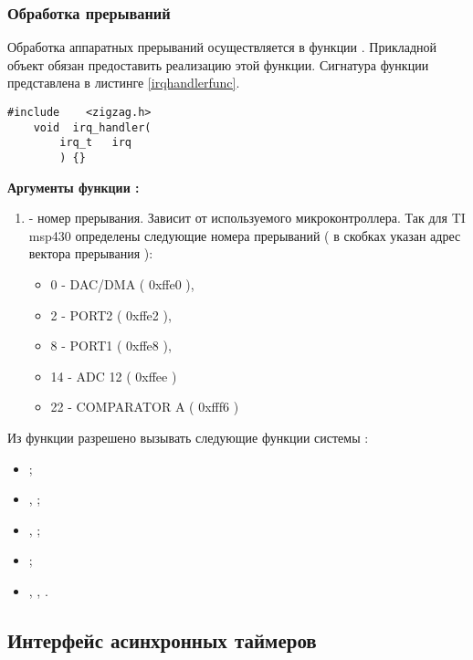 \subsubsection{Обработка прерываний}

Обработка аппаратных прерываний осуществляется в функции . Прикладной объект обязан 
предоставить реализацию этой функции. Сигнатура функции представлена в листинге \ref{irqhandlerfunc}.

\begin{lstlisting}[caption=Функция \myfunc{irq\_handler()} - обработчик прерываний., label=irqhandlerfunc ]
    #include    <zigzag.h>
    void  irq_handler(
        irq_t   irq
        ) {}
\end{lstlisting}

{\bfseries Аргументы функции :}

{\itshape
\begin{enumerate}
\item {} - номер прерывания. Зависит от используемого микроконтроллера. Так для TI msp430 определены
следующие номера прерываний ( в скобках указан адрес вектора прерывания ):
    \begin{itemize}
        \item 0 - DAC/DMA ( 0xffe0 ),
        \item 2 - PORT2 ( 0xffe2 ),
        \item 8 - PORT1 ( 0xffe8 ),
        \item 14 - ADC 12 ( 0xffee )
        \item 22 - COMPARATOR A ( 0xfff6 )
    \end{itemize}
\end{enumerate}
}

Из функции  разрешено вызывать следующие функции системы \zigzag:
\begin{itemize}
\item {};
\item {}, ;
\item {},  ;
\item {};
\item {}, , .
\end{itemize}


\subsection{Интерфейс асинхронных таймеров}


